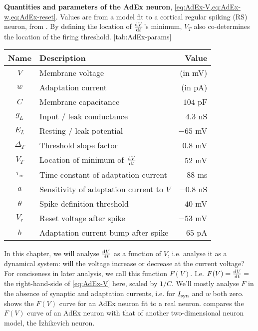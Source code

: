 \begin{table}[h]
    \vspace*{1.8em} %
    \begin{sidecaption}
        {\textbf{Quantities and parameters of the AdEx neuron}, \cref{eq:AdEx-V,eq:AdEx-w,eq:AdEx-reset}. Values are from a model fit to a cortical regular spiking (RS) neuron, from \cite{Naud2008FiringPatternsAdaptive}. By defining the location of $\frac{\mathrm{d}V}{\mathrm{d}t}$'s minimum, $V_T$ also co-determines the location of the firing threshold.}
        [tab:AdEx-params]
        \begin{tabular}{c l r}
            Name  & Description & Value \\
            \hline
            $V$  & Membrane voltage & (in mV) \\
            $w$   & Adaptation current & (in pA) \\
            $C$ & Membrane capacitance & $104$ pF \\
            $g_L$ & Input / leak conductance & $4.3$ nS \\
            $E_L$  & Resting / leak potential & $-65$ mV \\
            $Δ_T$  & Threshold slope factor & $0.8$ mV \\
            $V_T$  & Location of minimum of $\frac{\mathrm{d}V}{\mathrm{d}t}$ & $-52$ mV \\
            $τ_w$   & Time constant of adaptation current & $88$ ms \\
            $a$ & Sensitivity of adaptation current to $V$ & $-0.8$ nS \\
            $θ$ & Spike definition threshold & $40$ mV \\
            $V_r$  & Reset voltage after spike & $-53$ mV \\
            $b$ & Adaptation current bump after spike & $65$ pA
        \end{tabular}
    \end{sidecaption}
    \vspace*{1em}
\end{table}


In this chapter, we will analyse $\frac{\mathrm{d}V}{\mathrm{d}t}$ as a function of $V$, i.e. analyse it as a dynamical system: will the voltage increase or decrease at the current voltage?
For conciseness in later analysis, we call this function $F(V)$. I.e. $F(V) = \frac{\mathrm{d}V}{\mathrm{d}t} =$ the right-hand-side of \cref{eq:AdEx-V} here, scaled by $1/ C$. We'll mostly analyse $F$ in the absence of synaptic and adaptation currents, i.e. for $I_{\text{syn}}$ and $w$ both zero.
 shows the $F(V)$ curve for an AdEx neuron fit to a real neuron.  compares the $F(V)$ curve of an AdEx neuron  with that of another two-dimensional neuron model, the Izhikevich neuron.

